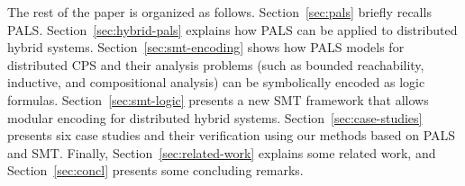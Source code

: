 The rest of the paper is organized as follows.
%
Section~\ref{sec:pals} briefly recalls PALS.
Section~\ref{sec:hybrid-pals} explains how PALS can be applied to distributed hybrid systems.
Section~\ref{sec:smt-encoding} shows how PALS models for distributed CPS
and their analysis problems (such as bounded reachability, inductive, and compositional analysis)
can be symbolically encoded as logic formulas.
Section~\ref{sec:smt-logic} presents a new SMT framework that allows 
modular encoding for distributed hybrid systems. %
Section~\ref{sec:case-studies} presents six case studies and their verification 
using our methods based on PALS and SMT.
Finally,
Section~\ref{sec:related-work} explains some related work,
and 
Section~\ref{sec:concl} presents some concluding remarks.



